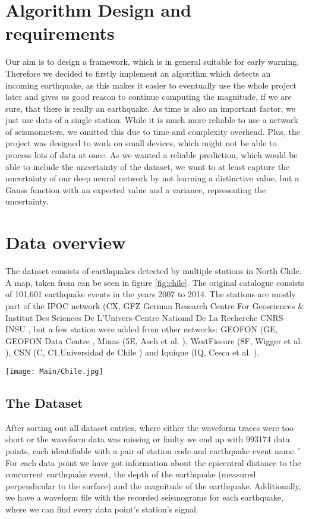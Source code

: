 \documentclass[thesis.tex]{subfiles}
\begin{document}
\section{Algorithm Design and requirements}
Our aim is to design a framework, which is in general suitable for early warning. Therefore we decided to firstly implement an algorithm which detects an incoming earthquake, as this makes it easier to eventually use the whole project later and gives us good reason to continue computing the magnitude, if we are sure, that there is really an earthquake. As time is also an important factor, we just use data of a single station. While it is much more reliable to use a network of seismometers, we omitted this due to time and complexity overhead. Plus, the project was designed to work on small devices, which might not be able to process lots of data at once. As we wanted a reliable prediction, which would be able to include the uncertainty of the dataset, we want to at least capture the uncertainty of our deep neural network by not learning a distinctive value, but a Gauss function with an expected value and a variance, representing the uncertainty.
\section{Data overview}
The dataset consists of earthquakes detected by multiple stations in North Chile. A map, taken from \cite{Munchmeyer2020} can be seen in figure \ref{fig:chile}. The original catalogue consists of 101,601 earthquake events in the years 2007 to 2014. The stations are mostly part of the IPOC network (CX, GFZ German Research Centre For Geosciences \& Institut Des Sciences De L’Univers-Centre National De La Recherche CNRS-INSU \citeyear{fdsnCX}, but a few station were added from other networks: GEOFON (GE, GEOFON Data Centre \citeyear{fdsnGE}, Minas (5E, Asch et al. \citeyear{fdsn5E}), WestFissure (8F, Wigger et al. \citeyear{fdsn8F}), CSN (C, C1,Universidad de Chile \citeyear{fdsnC1}) and Iquique (IQ, Cesca et al. \citeyear{fdsnIQ}).
\begin{figure*}[h!]
	\centering
	\texttt{[image: Main/Chile.jpg]}
	\caption{A map of all station of the Chile dataset with colour-coded depth for the earthquake events.}
	\label{fig:chile}
\end{figure*}
\subsection{The Dataset}
After sorting out all dataset entries, where either the waveform traces were too short or the waveform data was missing or faulty we end up with 993174 data points, each identifiable with a pair of station code and earthquake event name.´ For each data point we have got information about the epicentral distance to the concurrent earthquake event, the depth of the earthquake (measured perpendicular to the surface) and the magnitude of the earthquake. Additionally, we have a waveform file with the recorded seismograms for each earthquake, where we can find every data point's station's signal.
\end{document}
